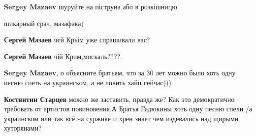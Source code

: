\begin{itemize}
\textbf{Sergey Mazaev} шуруйте на піструна або в розкішницю

 
шикарный срач, мазафака)

 
\textbf{Сергей Мазаев} чєй Крьім уже спрашивали вас?

 
\textbf{Сергей Мазаев} чій Крим,москаль????.

 
\textbf{Sergey Mazaev}, о объясните братьям, что за 30 лет можно было хоть одну песню спеть на украинском, а не ловить хайп сейчас)))

\begin{itemize}
 
\textbf{Костянтин Старцев} можно же заставить, правда же? Как это демократично требовать от артистов повиновения.А Братья Гадюкины хоть одну песню спели /а украинском или так всё на суржике и хрен знает чем издевались над щирыми хуторянами?

 

\end{itemize}
\end{itemize}

